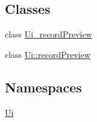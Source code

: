 \subsection*{Classes}
\begin{DoxyCompactItemize}
\item 
class \hyperlink{a00028}{Ui\+\_\+record\+Preview}
\item 
class \hyperlink{a00021}{Ui\+::record\+Preview}
\end{DoxyCompactItemize}
\subsection*{Namespaces}
\begin{DoxyCompactItemize}
\item 
 \hyperlink{a00055}{Ui}
\end{DoxyCompactItemize}
